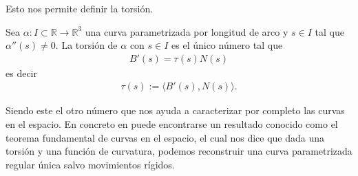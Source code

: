 \documentclass[oneside,11pt]{memoir}
\begin{document}
Esto nos permite definir la torsión.
\begin{definition}
    Sea $\alpha:I\subset \mathbb{R}\to\mathbb{R}^3$ una curva parametrizada por longitud de arco y $s\in I$ tal que $\alpha''(s)\neq 0$. La torsión de $\alpha$ con $s\in I$ es el único número tal que
    \begin{align*}       B'(s)=\tau(s)N(s)
    \end{align*}
    es decir
    \begin{align*}
        \tau(s):=\langle B'(s), N(s) \rangle.
    \end{align*}
\end{definition}
Siendo este el otro número que nos ayuda a caracterizar por completo las curvas en el espacio. En concreto en \cite[p.~18]{montiel2009curves} puede encontrarse un resultado conocido como el teorema fundamental de curvas en el espacio, el cual nos dice que dada una torsión y una función de curvatura, podemos reconstruir una curva parametrizada regular única salvo movimientos rígidos. 
\end{document}
